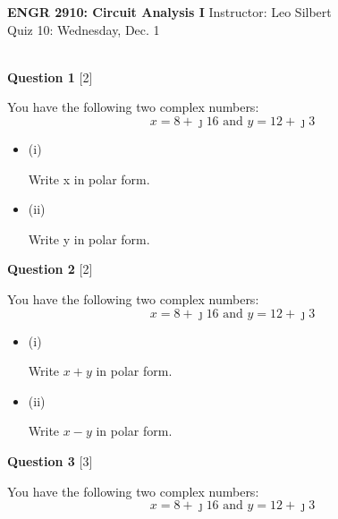 \documentclass[12pt]{article}
\newcommand{\bit}{\begin{itemize}}
\newcommand{\eit}{\end{itemize}}
\begin{document}

\begin{center}
\hfil
{\large\bf {ENGR 2910: Circuit Analysis I}}
\hfill Instructor: Leo Silbert \\
Quiz 10: Wednesday, Dec. 1\\
\hrulefill\\
\end{center}




\noindent
{\bf Question 1} [2]

You have the following two complex numbers: 
\[ 
x = 8 + \jmath 16 \text{  and  } y = 12 + \jmath 3
\]

\bit 

\item[(i)]

Write x in polar form.

\vspace{1.5in}
\item[(ii)]

Write y in polar form.


\vspace{1.5in}

\eit

\noindent
{\bf Question 2} [2]

You have the following two complex numbers: 
\[ 
x = 8 + \jmath 16 \text{  and  } y = 12 + \jmath 3
\]

\bit 

\item[(i)]

Write $x+y$ in polar form.

\vspace{1.5in}
\item[(ii)]

Write $x-y$ in polar form.


\vspace{1.5in}

\eit

\newpage
\noindent
{\bf Question 3} [3]

You have the following two complex numbers: 
\[ 
x = 8 + \jmath 16 \text{  and  } y = 12 + \jmath 3
\]
\end{document}
